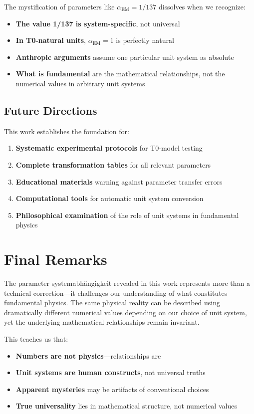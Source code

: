 \documentclass[12pt,a4paper]{article}
\begin{document}
	The mystification of parameters like $\alpha_{\text{EM}} = 1/137$ dissolves when we recognize:
	
	\begin{itemize}
		\item \textbf{The value 1/137 is system-specific}, not universal
		\item \textbf{In T0-natural units}, $\alpha_{\text{EM}} = 1$ is perfectly natural
		\item \textbf{Anthropic arguments} assume one particular unit system as absolute
		\item \textbf{What is fundamental} are the mathematical relationships, not the numerical values in arbitrary unit systems
	\end{itemize}
	
	\subsection{Future Directions}
	\label{subsec:future_directions}
	
	This work establishes the foundation for:
	
	\begin{enumerate}
		\item \textbf{Systematic experimental protocols} for T0-model testing
		\item \textbf{Complete transformation tables} for all relevant parameters
		\item \textbf{Educational materials} warning against parameter transfer errors
		\item \textbf{Computational tools} for automatic unit system conversion
		\item \textbf{Philosophical examination} of the role of unit systems in fundamental physics
	\end{enumerate}
	
	\section{Final Remarks}
	\label{sec:final_remarks}
	
	The parameter systemabhängigkeit revealed in this work represents more than a technical correction---it challenges our understanding of what constitutes fundamental physics. The same physical reality can be described using dramatically different numerical values depending on our choice of unit system, yet the underlying mathematical relationships remain invariant.
	
	This teaches us that:
	\begin{itemize}
		\item \textbf{Numbers are not physics}---relationships are
		\item \textbf{Unit systems are human constructs}, not universal truths  
		\item \textbf{Apparent mysteries} may be artifacts of conventional choices
		\item \textbf{True universality} lies in mathematical structure, not numerical values
	\end{itemize}
	
\end{document}
